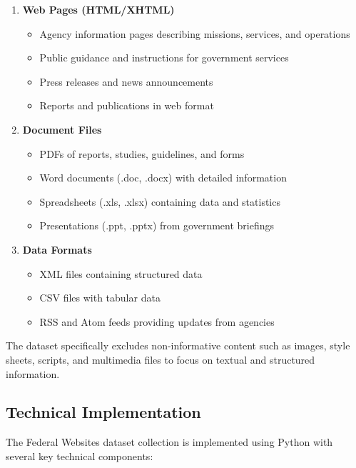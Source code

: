 \begin{enumerate}
    \item \textbf{Web Pages (HTML/XHTML)}
    \begin{itemize}
        \item Agency information pages describing missions, services, and operations
        \item Public guidance and instructions for government services
        \item Press releases and news announcements
        \item Reports and publications in web format
    \end{itemize}
    
    \item \textbf{Document Files}
    \begin{itemize}
        \item PDFs of reports, studies, guidelines, and forms
        \item Word documents (.doc, .docx) with detailed information
        \item Spreadsheets (.xls, .xlsx) containing data and statistics
        \item Presentations (.ppt, .pptx) from government briefings
    \end{itemize}
    
    \item \textbf{Data Formats}
    \begin{itemize}
        \item XML files containing structured data
        \item CSV files with tabular data
        \item RSS and Atom feeds providing updates from agencies
    \end{itemize}
\end{enumerate}

The dataset specifically excludes non-informative content such as images, style sheets, scripts, and multimedia files to focus on textual and structured information.

\subsection{Technical Implementation}

The Federal Websites dataset collection is implemented using Python with several key technical components:

